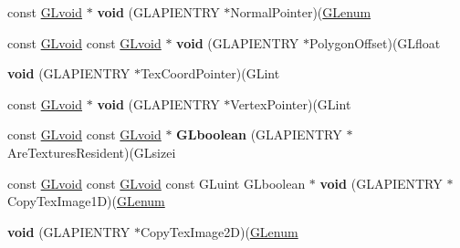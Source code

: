 \begin{DoxyCompactItemize}
\item 
\mbox{\label{struct_____g_ldispatch_table_rec_a82d7d99552405d284815d3dca3e19e22}} 
const \hyperlink{interfacevoid}{G\+Lvoid} $\ast$ {\bfseries void} (G\+L\+A\+P\+I\+E\+N\+T\+RY $\ast$Normal\+Pointer)(\hyperlink{interfacevoid}{G\+Lenum}
\item 
\mbox{\label{struct_____g_ldispatch_table_rec_a436da6419bb969ead3a4bb15446d3863}} 
const \hyperlink{interfacevoid}{G\+Lvoid} const \hyperlink{interfacevoid}{G\+Lvoid} $\ast$ {\bfseries void} (G\+L\+A\+P\+I\+E\+N\+T\+RY $\ast$Polygon\+Offset)(G\+Lfloat
\item 
\mbox{\label{struct_____g_ldispatch_table_rec_a650e081ae82833f8d46a3722df1f71dd}} 
{\bfseries void} (G\+L\+A\+P\+I\+E\+N\+T\+RY $\ast$Tex\+Coord\+Pointer)(G\+Lint
\item 
\mbox{\label{struct_____g_ldispatch_table_rec_aea7d0157f316e286da126a1cba93e9fb}} 
const \hyperlink{interfacevoid}{G\+Lvoid} $\ast$ {\bfseries void} (G\+L\+A\+P\+I\+E\+N\+T\+RY $\ast$Vertex\+Pointer)(G\+Lint
\item 
\mbox{\label{struct_____g_ldispatch_table_rec_a4c4bbfb389338d320c1d35adbe1837f6}} 
const \hyperlink{interfacevoid}{G\+Lvoid} const \hyperlink{interfacevoid}{G\+Lvoid} $\ast$ {\bfseries G\+Lboolean} (G\+L\+A\+P\+I\+E\+N\+T\+RY $\ast$Are\+Textures\+Resident)(G\+Lsizei
\item 
\mbox{\label{struct_____g_ldispatch_table_rec_aa5401746b13128ef58aef30b6f97ca50}} 
const \hyperlink{interfacevoid}{G\+Lvoid} const \hyperlink{interfacevoid}{G\+Lvoid} const G\+Luint G\+Lboolean $\ast$ {\bfseries void} (G\+L\+A\+P\+I\+E\+N\+T\+RY $\ast$Copy\+Tex\+Image1D)(\hyperlink{interfacevoid}{G\+Lenum}
\item 
\mbox{\label{struct_____g_ldispatch_table_rec_adae72d009189948d87a3aad81cf41cbd}} 
{\bfseries void} (G\+L\+A\+P\+I\+E\+N\+T\+RY $\ast$Copy\+Tex\+Image2D)(\hyperlink{interfacevoid}{G\+Lenum}
\item 
\mbox{\label{struct_____g_ldispatch_table_rec_afc81868978cfd8cc22d8d8023f863fe4}} 

\end{DoxyCompactItemize}
